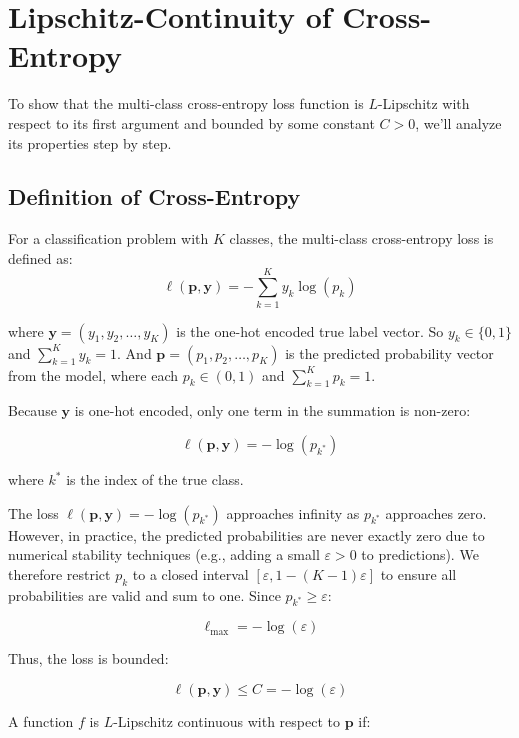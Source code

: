 {\color{black}
\section{Lipschitz-Continuity of Cross-Entropy}
\label{appendix:l}

To show that the multi-class cross-entropy loss function is \( L \)-Lipschitz with respect to its first argument and bounded by some constant \( C > 0 \), we'll analyze its properties step by step.

\subsection{Definition of Cross-Entropy}
\begin{definition}
    For a classification problem with \( K \) classes, the multi-class cross-entropy loss is defined as:
\[
\ell(\mathbf{p}, \mathbf{y}) = -\sum_{k=1}^{K} y_k \log(p_k)
\]
\end{definition}


where \( \mathbf{y} = (y_1, y_2, \dots, y_K) \) is the one-hot encoded true label vector. So \( y_k \in \{0, 1\} \) and \( \sum_{k=1}^{K} y_k = 1 \).
And \( \mathbf{p} = (p_1, p_2, \dots, p_K) \) is the predicted probability vector from the model, where each \( p_k \in (0, 1) \) and \( \sum_{k=1}^{K} p_k = 1 \).

Because \( \mathbf{y} \) is one-hot encoded, only one term in the summation is non-zero:

\[
\ell(\mathbf{p}, \mathbf{y}) = -\log(p_{k^*})
\]

where \( k^* \) is the index of the true class.

The loss \( \ell(\mathbf{p}, \mathbf{y}) = -\log(p_{k^*}) \) approaches infinity as \( p_{k^*} \) approaches zero. However, in practice, the predicted probabilities are never exactly zero due to numerical stability techniques (e.g., adding a small \( \varepsilon > 0 \) to predictions).
We therefore restrict \( p_k \) to a closed interval \( [\varepsilon, 1 - (K - 1)\varepsilon] \) to ensure all probabilities are valid and sum to one. Since \( p_{k^*} \geq \varepsilon \):

\[
\ell_{\text{max}} = -\log(\varepsilon)
\]

Thus, the loss is bounded:

\[
\ell(\mathbf{p}, \mathbf{y}) \leq C = -\log(\varepsilon)
\]


\begin{definition}
    A function \( f \) is \( L \)-Lipschitz continuous with respect to \( \mathbf{p} \) if:


\end{definition}}
